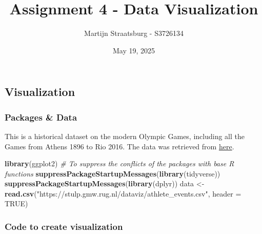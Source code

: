 \documentclass[
]{article}
\title{Assignment 4 - Data Visualization}
\author{Martijn Straatsburg - S3726134}
\date{May 19, 2025}
\newenvironment{Shaded}{\begin{snugshade}}{\end{snugshade}}
\newcommand{\AttributeTok}[1]{\textcolor[rgb]{0.13,0.29,0.53}{#1}}
\newcommand{\CommentTok}[1]{\textcolor[rgb]{0.56,0.35,0.01}{\textit{#1}}}
\newcommand{\ConstantTok}[1]{\textcolor[rgb]{0.56,0.35,0.01}{#1}}
\newcommand{\FunctionTok}[1]{\textcolor[rgb]{0.13,0.29,0.53}{\textbf{#1}}}
\newcommand{\NormalTok}[1]{#1}
\newcommand{\OtherTok}[1]{\textcolor[rgb]{0.56,0.35,0.01}{#1}}
\newcommand{\StringTok}[1]{\textcolor[rgb]{0.31,0.60,0.02}{#1}}
\begin{document}
\maketitle

\subsection{Visualization}\label{visualization}

\subsubsection{Packages \& Data}\label{packages-data}

This is a historical dataset on the modern Olympic Games, including all
the Games from Athens 1896 to Rio 2016. The data was retrieved from
\href{https://www.kaggle.com/heesoo37/120-years-of-olympic-history-athletes-and-results}{here}.

\begin{Shaded}
\begin{Highlighting}[]
\FunctionTok{library}\NormalTok{(ggplot2)}
\CommentTok{\# To suppress the conflicts of the packages with base R functions}
\FunctionTok{suppressPackageStartupMessages}\NormalTok{(}\FunctionTok{library}\NormalTok{(tidyverse))}
\FunctionTok{suppressPackageStartupMessages}\NormalTok{(}\FunctionTok{library}\NormalTok{(dplyr))}
\NormalTok{data  }\OtherTok{\textless{}{-}} \FunctionTok{read.csv}\NormalTok{(}\StringTok{"https://stulp.gmw.rug.nl/dataviz/athlete\_events.csv"}\NormalTok{, }
                 \AttributeTok{header =} \ConstantTok{TRUE}\NormalTok{)}
\end{Highlighting}
\end{Shaded}

\subsubsection{Code to create
visualization}\label{code-to-create-visualization}
\end{document}
